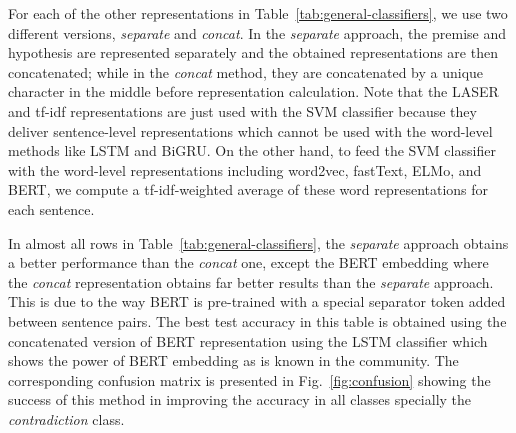 \documentclass[preprint,12pt]{elsarticle}
\begin{document}
For each of the other representations in Table~\ref{tab:general-classifiers}, we use two different versions, \textit{separate} and \textit{concat}. In the \textit{separate} approach, the premise and hypothesis are represented separately and the obtained representations are then concatenated; while in the \textit{concat} method, they are concatenated by a unique character in the middle before representation calculation. Note that the LASER and tf-idf representations are just used with the SVM classifier because they deliver sentence-level representations which cannot be used with the word-level methods like LSTM and BiGRU. On the other hand, to feed the SVM classifier with the word-level representations including word2vec, fastText, ELMo, and BERT, we compute a tf-idf-weighted average of these word representations for each sentence.

In almost all rows in Table~\ref{tab:general-classifiers}, the \textit{separate} approach obtains a better performance than the \textit{concat} one, except the BERT embedding where the \textit{concat} representation obtains far better results than the \textit{separate} approach. This is due to the way BERT is pre-trained with a special separator token added between sentence pairs. The best test accuracy in this table is obtained using the concatenated version of BERT representation using the LSTM classifier which shows the power of BERT embedding as is known in the community. The corresponding confusion matrix is presented in Fig.~\ref{fig:confusion} showing the success of this method in improving the accuracy in all classes specially the \textit{contradiction} class.
\end{document}
